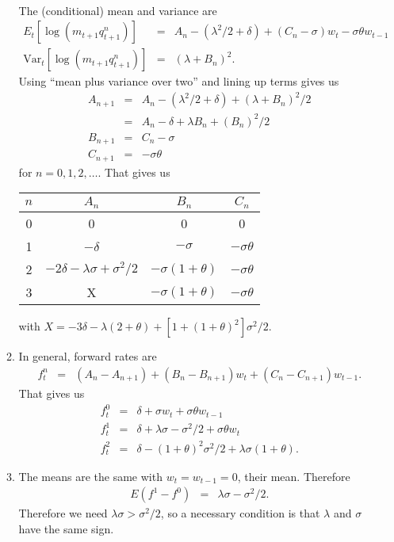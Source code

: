 \documentclass[11pt]{article}
\begin{document}
\begin{enumerate}
\begin{enumerate}
\begin{eqnarray*}
\end{eqnarray*}
The (conditional) mean and variance are
\begin{eqnarray*}
    E_t [ \log (m_{t+1} q_{t+1}^n)] &=&
            A_n - (\lambda^2/2 + \delta)
            + (C_n-\sigma) w_t - \sigma \theta w_{t-1} \\
    \mbox{Var}_t [\log (m_{t+1} q_{t+1}^n)] &=&
            (\lambda+B_n)^2 .
\end{eqnarray*}
Using ``mean plus variance over two'' and lining up terms gives us
\begin{eqnarray*}
        A_{n+1} &=& A_n - (\lambda^2/2 + \delta) + (\lambda+B_n)^2/2 \\
                &=& A_n - \delta + \lambda B_n + (B_n)^2/2 \\
        B_{n+1} &=& C_n - \sigma \\
        C_{n+1} &=& - \sigma \theta
\end{eqnarray*}
for $n=0,1,2,\ldots$.
That gives us
\begin{center}
\begin{tabular}{cccc}
        $n$  & $A_n$ & $B_n$ & $C_n$ \\
        \midrule
        0   &  0 & 0 & 0 \\
        1   &  $-\delta$ & $-\sigma$ & $-\sigma\theta$  \\
        2   &  $-2 \delta - \lambda\sigma + \sigma^2/2$   &  $-\sigma(1+\theta)$ & $-\sigma\theta$ \\
        3   &  X  &  $-\sigma(1+\theta)$ & $-\sigma\theta$
\end{tabular}
\end{center}
with
$X = - 3 \delta - \lambda (2+\theta)+ [1 + (1+\theta)^2] \sigma^2/2 $.

\item In general, forward rates are
\begin{eqnarray*}
    f^n_t &=& (A_n - A_{n+1}) + (B_n - B_{n+1}) w_t + (C_n - C_{n+1}) w_{t-1} .
\end{eqnarray*}
That gives us
\begin{eqnarray*}
    f^0_t &=& \delta + \sigma w_t + \sigma \theta  w_{t-1} \\
    f^1_t &=& \delta + \lambda\sigma - \sigma^2/2 + \sigma \theta w_t  \\
    f^2_t &=& \delta - (1+\theta)^2 \sigma^2/2 + \lambda \sigma (1+\theta) .
\end{eqnarray*}

\item The means are the same with $w_t = w_{t-1} = 0$, their mean.
Therefore
\begin{eqnarray*}
   E (f^1 - f^0) &=& \lambda \sigma - \sigma^2/2 .
\end{eqnarray*}
Therefore we need $\lambda\sigma > \sigma^2/2 $,
so a necessary condition is that $\lambda$ and $\sigma$ have the same sign.


\end{enumerate}
\end{enumerate}
\end{document}
